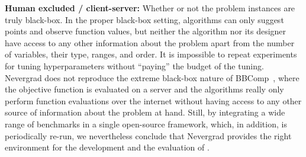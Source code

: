 



\textbf{Human excluded / client-server:} Whether or not the problem instances are truly black-box. In the proper black-box setting, algorithms can only suggest points and observe function values, but neither the algorithm nor its designer have access to any other information about the problem apart from the number of variables, their type, ranges, and order. It is impossible to repeat experiments for tuning hyperparameters without ``paying'' the budget of the tuning. %
% 
Nevergrad does not reproduce the extreme black-box nature of {BBComp~\cite{BBCOMP2017}, where the objective function is evaluated on a server and the algorithms really only perform function evaluations over the internet without having access to any other source of information about the problem at hand.} Still, by integrating a wide range of benchmarks in a single open-source framework, which, in addition, is periodically re-run, we nevertheless conclude that Nevergrad provides the right environment for the development and the evaluation of \ngoptq{}.


